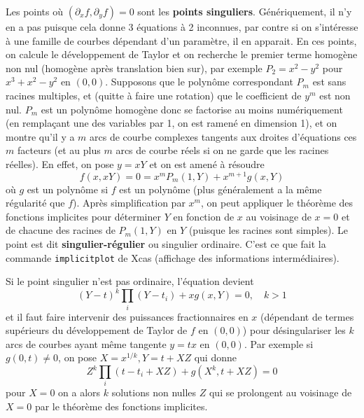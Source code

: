 \documentclass[a4paper,11pt]{article}
\begin{document}
Les points o\`u $(\partial_x f,\partial_y f)=0$ sont
les {\bf points singuliers}. 
G\'en\'eriquement, il n'y en a pas puisque
cela donne 3 \'equations \`a 2 inconnues, par contre si on
s'int\'eresse \`a une famille de courbes d\'ependant d'un
param\`etre, il en apparait. En ces points, on calcule le
d\'eveloppement de Taylor et on recherche le premier
terme homog\`ene non nul (homog\`ene apr\`es translation bien sur), 
par exemple
$P_2=x^2-y^2$ pour $x^3+x^2-y^2$ en $(0,0)$. 
Supposons que le polyn\^ome
correspondant $P_m$ est sans racines multiples, et (quitte
\`a faire une rotation) que le coefficient de $y^m$ est non nul.
$P_m$ est un polyn\^ome homog\`ene 
donc se factorise au moins num\'eriquement
(en rempla\c{c}ant une des variables par 1, on est ramen\'e en dimension 1),
et on montre qu'il y a $m$ arcs de courbe complexes tangents
aux droites d'\'equations ces $m$ facteurs (et au plus
$m$ arcs de courbe r\'eels si on ne garde
que les racines r\'eelles). En effet, on pose $y=xY$ et on 
est amen\'e \`a r\'esoudre
$$ f(x,xY)=0=x^mP_m(1,Y) + x^{m+1} g(x,Y)$$
o\`u $g$ est un polyn\^ome si $f$ est un polyn\^ome 
(plus g\'en\'eralement a la m\^eme r\'egularit\'e que $f$). 
Apr\`es simplification par $x^m$, on peut appliquer le th\'eor\`eme des
fonctions implicites pour d\'eterminer $Y$ en fonction de $x$ au
voisinage de $x=0$ et de chacune des racines de $P_m(1,Y)$ en $Y$
(puisque les racines sont simples).
Le point 
est dit {\bf singulier-r\'egulier} ou
singulier ordinaire. 
C'est ce que fait la commande \verb|implicitplot| de Xcas
(affichage des informations interm\'ediaires).

Si le point singulier n'est pas ordinaire, l'\'equation devient
$$ (Y-t)^k \prod_i (Y-t_i) + xg(x,Y)=0, \quad k>1$$
et il faut faire intervenir des puissances fractionnaires en $x$
(d\'ependant de termes sup\'erieurs du d\'eveloppement de Taylor
de $f$ en $(0,0)$)
pour d\'esingulariser les $k$ arcs de courbes ayant m\^eme tangente
$y=tx$ en $(0,0)$. Par exemple si $g(0,t) \neq 0$, 
on pose $X=x^{1/k}, Y=t+XZ$
qui donne 
$$ Z^k \prod_i (t-t_i+XZ) + g(X^k,t+XZ)=0$$
pour $X=0$ on a alors $k$ solutions non nulles $Z$ qui
se prolongent au voisinage de $X=0$ par le th\'eor\`eme des
fonctions implicites.
\end{document}
